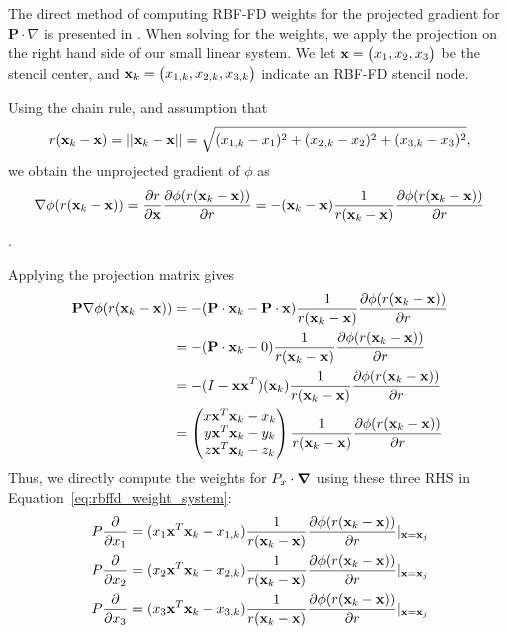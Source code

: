 \documentclass{report}
\begin{document}
{The direct method of computing RBF-FD weights for the projected gradient for $\mathbf{P} \cdot \nabla $ is presented in \cite{FlyerWright09}. When solving for the weights, we apply the projection on the right hand side of our small linear system. We let $\mathbf{x} = \begin{pmatrix} x_1, x_2, x_3 \end{pmatrix} $ be the stencil center, and $\mathbf{x}_k=\begin{pmatrix} x_{1,k}, x_{2,k}, x_{3,k}\end{pmatrix}$ indicate an RBF-FD stencil node. 

Using the chain rule, and assumption that 
$$r(\mathbf{x}_k-\mathbf{x})=\left|\left|\mathbf{x}_k-\mathbf{x}\right|\right| = \sqrt{(x_{1,k}-x_1)^2 + (x_{2,k}-x_2)^2 + (x_{3,k}-x_3)^2},$$
 we obtain the unprojected gradient of $\phi$ as
$$\nabla \phi(r(\mathbf{x}_k - \mathbf{x})) = \frac{\partial r}{\partial \mathbf{x}} \frac{\partial \phi(r(\mathbf{x}_k - \mathbf{x}))}{\partial r} = - (\mathbf{x}_k - \mathbf{x})\frac{1}{r(\mathbf{x}_k - \mathbf{x})} \frac{\partial \phi(r(\mathbf{x}_k - \mathbf{x}))}{\partial r}$$. 

Applying the projection matrix gives 
\begin{align*}
\mathbf{P} \nabla \phi(r(\mathbf{x}_k - \mathbf{x})) & = - (\mathbf{P} \cdot \mathbf{x}_k - \mathbf{P}\cdot\mathbf{x})\frac{1}{r(\mathbf{x}_k - \mathbf{x})} \frac{\partial \phi(r(\mathbf{x}_k - \mathbf{x}))}{\partial r} \\
& =  - (\mathbf{P}\cdot\mathbf{x}_k - 0)\frac{1}{r(\mathbf{x}_k - \mathbf{x})} \frac{\partial \phi(r(\mathbf{x}_k - \mathbf{x}))}{\partial r} \\
& = - (I-\mathbf{x}\mathbf{x}^T)(\mathbf{x}_k
)\frac{1}{r(\mathbf{x}_k - \mathbf{x})} \frac{\partial \phi(r(\mathbf{x}_k - \mathbf{x}))}{\partial r} \\
& = \begin{pmatrix} x \mathbf{x}^T \mathbf{x}_k - x_k \\ y \mathbf{x}^T \mathbf{x}_k -  y_k \\ z \mathbf{x}^T \mathbf{x}_k -z_k \end{pmatrix} \frac{1}{r(\mathbf{x}_k - \mathbf{x})} \frac{\partial \phi(r(\mathbf{x}_k - \mathbf{x}))}{\partial r} 
 \end{align*}
Thus, we directly compute the weights for $P_{x}\cdot\mbox{\boldmath$ \nabla $}$ using these three RHS in Equation~\ref{eq:rbffd_weight_system}: 
\begin{align} 
P\frac{\partial }{\partial x_1} = ( x_1 \mathbf{x}^T \mathbf{x}_k - x_{1,k}) \frac{1}{r(\mathbf{x}_k - \mathbf{x})} \frac{\partial \phi(r(\mathbf{x}_k - \mathbf{x}))}{\partial r} |_{\mathbf{x}=\mathbf{x}_j} \\
P\frac{\partial }{\partial x_2} = ( x_2 \mathbf{x}^T \mathbf{x}_k - x_{2,k}) \frac{1}{r(\mathbf{x}_k - \mathbf{x})} \frac{\partial \phi(r(\mathbf{x}_k - \mathbf{x}))}{\partial r} |_{\mathbf{x}=\mathbf{x}_j} \\
P\frac{\partial }{\partial x_3} = ( x_3 \mathbf{x}^T \mathbf{x}_k - x_{3,k}) \frac{1}{r(\mathbf{x}_k - \mathbf{x})} \frac{\partial \phi(r(\mathbf{x}_k - \mathbf{x}))}{\partial r} |_{\mathbf{x}=\mathbf{x}_j}
\end{align}

}
\end{document}
